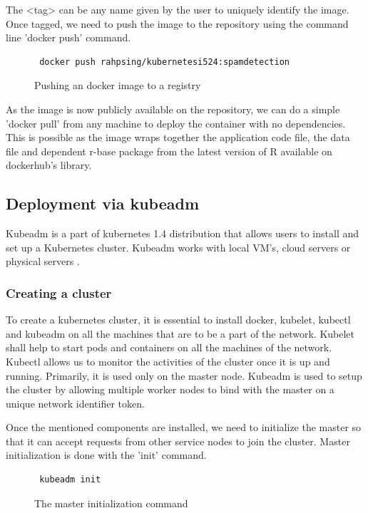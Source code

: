\documentclass[9pt,twocolumn,twoside]{../../styles/osajnl}
\begin{document}
\noindent
The <tag> can be any name given by the user to uniquely identify the
image. Once tagged, we need to push the image to the repository using
the command line 'docker push' command.

\begin{figure}[H]
\begin{verbatim}
 docker push rahpsing/kubernetesi524:spamdetection
\end{verbatim}
\caption{Pushing an docker image to a registry}
\label{Pushing an docker image to a registry}
\end{figure}

\noindent
As the image is now publicly available on the repository, we can do a
simple 'docker pull' from any machine to deploy the container with no
dependencies. This is possible as the image wraps together the
application code file, the data file and dependent r-base package from
the latest version of R available on dockerhub's library.

\subsection{Deployment via kubeadm}

Kubeadm is a part of kubernetes 1.4 distribution that allows users to
install and set up a Kubernetes cluster. Kubeadm works with local
VM's, cloud servers or physical servers \cite{www-kubernetes-kubeadm}.

\subsubsection{Creating a cluster}
To create a kubernetes cluster, it is essential to install docker,
kubelet, kubectl and kubeadm on all the machines that are to be a part
of the network. Kubelet shall help to start pods and containers on all
the machines of the network. Kubectl allows us to monitor the
activities of the cluster once it is up and running. Primarily, it is
used only on the master node. Kubeadm is used to setup the cluster by
allowing multiple worker nodes to bind with the master on a unique
network identifier token.

\noindent
Once the mentioned components are installed, we need to initialize the
master so that it can accept requests from other service nodes to join
the cluster. Master initialization is done with the 'init' command.

\begin{figure}[H]
\begin{verbatim}
 kubeadm init
\end{verbatim}
\caption{The master initialization command}
\label{The master initialization command}
\end{figure}
\end{document}
